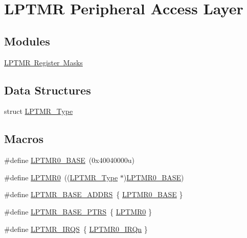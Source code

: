 \hypertarget{group___l_p_t_m_r___peripheral___access___layer}{}\section{L\+P\+T\+MR Peripheral Access Layer}
\label{group___l_p_t_m_r___peripheral___access___layer}
\subsection*{Modules}
\begin{DoxyCompactItemize}
\item 
\mbox{\hyperlink{group___l_p_t_m_r___register___masks}{L\+P\+T\+M\+R Register Masks}}
\end{DoxyCompactItemize}
\subsection*{Data Structures}
\begin{DoxyCompactItemize}
\item 
struct \mbox{\hyperlink{struct_l_p_t_m_r___type}{L\+P\+T\+M\+R\+\_\+\+Type}}
\end{DoxyCompactItemize}
\subsection*{Macros}
\begin{DoxyCompactItemize}
\item 
\#define \mbox{\hyperlink{group___l_p_t_m_r___peripheral___access___layer_ga024f362857a8b928d96cf3b3f5106793}{L\+P\+T\+M\+R0\+\_\+\+B\+A\+SE}}~(0x40040000u)
\item 
\#define \mbox{\hyperlink{group___l_p_t_m_r___peripheral___access___layer_gaba0c3bc8a32ad5a884c99e019dbdef85}{L\+P\+T\+M\+R0}}~((\mbox{\hyperlink{struct_l_p_t_m_r___type}{L\+P\+T\+M\+R\+\_\+\+Type}} $\ast$)\mbox{\hyperlink{group___l_p_t_m_r___peripheral___access___layer_ga024f362857a8b928d96cf3b3f5106793}{L\+P\+T\+M\+R0\+\_\+\+B\+A\+SE}})
\item 
\#define \mbox{\hyperlink{group___l_p_t_m_r___peripheral___access___layer_ga62b4c0fde534c2c09ef0c30b3c4bb0e3}{L\+P\+T\+M\+R\+\_\+\+B\+A\+S\+E\+\_\+\+A\+D\+D\+RS}}~\{ \mbox{\hyperlink{group___l_p_t_m_r___peripheral___access___layer_ga024f362857a8b928d96cf3b3f5106793}{L\+P\+T\+M\+R0\+\_\+\+B\+A\+SE}} \}
\item 
\#define \mbox{\hyperlink{group___l_p_t_m_r___peripheral___access___layer_gac92660dedc63be48d689d43efc9f2c82}{L\+P\+T\+M\+R\+\_\+\+B\+A\+S\+E\+\_\+\+P\+T\+RS}}~\{ \mbox{\hyperlink{group___l_p_t_m_r___peripheral___access___layer_gaba0c3bc8a32ad5a884c99e019dbdef85}{L\+P\+T\+M\+R0}} \}
\item 
\#define \mbox{\hyperlink{group___l_p_t_m_r___peripheral___access___layer_ga5bf0032641d320fc7d486d703800c729}{L\+P\+T\+M\+R\+\_\+\+I\+R\+QS}}~\{ \mbox{\hyperlink{group___interrupt__vector__numbers_gga666eb0caeb12ec0e281415592ae89083a93853a8a41060ac37aa92ae9ee472c6e}{L\+P\+T\+M\+R0\+\_\+\+I\+R\+Qn}} \}
\end{DoxyCompactItemize}


